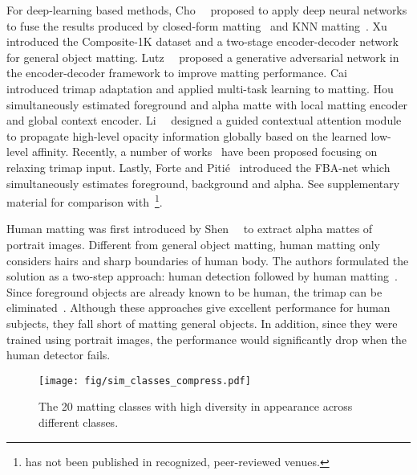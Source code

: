 \documentclass[10pt,twocolumn,letterpaper]{article}
\begin{document}
For deep-learning based methods, Cho~\etal~\cite{Cho-2016-mattingusingdeepcnn} proposed to apply deep neural networks to fuse the results produced by closed-form matting~\cite{levin2008closed} and KNN matting~\cite{Chen-2012-PAMI-knnmatting}. Xu~\etal~\cite{Xu2017DeepIM} introduced the Composite-1K dataset and a two-stage encoder-decoder network for general object matting. Lutz~\etal~\cite{Lutz2018AlphaGANGA} proposed a generative adversarial network in the encoder-decoder framework to improve matting performance. Cai~\etal~\cite{cai2019disentangled} introduced trimap adaptation and applied multi-task learning to matting.
Hou~\etal~\cite{hou2019context} simultaneously estimated foreground and alpha matte  with local matting encoder and global context encoder.
Li~\etal~\cite{li2020natural} designed a guided contextual attention module to propagate high-level opacity information globally based on the learned low-level affinity.
Recently, a number of works~\cite{zhang2019latefusioncnn, BMSengupta20, qiao2020attention} have been proposed focusing on relaxing trimap input. Lastly, Forte and Piti\'{e}~\cite{forte2020fbamatting} introduced the FBA-net which simultaneously estimates foreground, background and alpha. See supplementary material for comparison with~\cite{forte2020fbamatting}\footnote{\cite{forte2020fbamatting} has not been published in recognized, peer-reviewed venues.}.

\vspace{4pt}
Human matting was first introduced by Shen~\etal~\cite{Shen2016DeepAP} to extract alpha mattes of portrait images. Different from general object matting, human matting only considers hairs and sharp boundaries of human body. The authors formulated the solution as a two-step approach: human detection followed by human matting~\cite{zhu2017fastdeepmattingportrait}. Since foreground objects are already known to be human, the trimap can be eliminated~\cite{Chen2018SemanticHM,Liu_2020_CVPR}. Although these approaches give excellent performance for human subjects, they fall short of matting general objects. In addition, since they were trained  using portrait images, the performance would  significantly drop when the human detector fails.

\begin{figure*}[t]
\centering 
\texttt{[image: fig/sim\_classes\_compress.pdf]} 
\caption{The 20 matting classes with high diversity in appearance across different classes.}
\label{fig:classes}
\vspace{-12pt}
\end{figure*}
\end{document}
